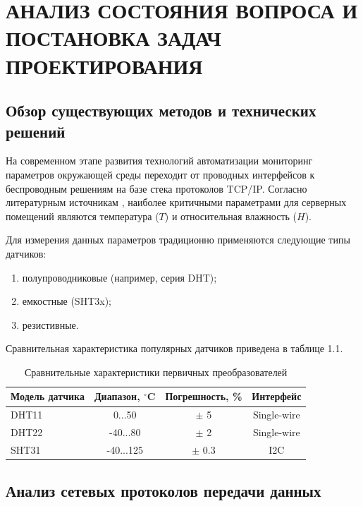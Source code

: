 \chapter{АНАЛИЗ СОСТОЯНИЯ ВОПРОСА И ПОСТАНОВКА ЗАДАЧ ПРОЕКТИРОВАНИЯ}

\section{Обзор существующих методов и технических решений}

На современном этапе развития технологий автоматизации мониторинг параметров окружающей среды переходит от проводных интерфейсов к беспроводным решениям на базе стека протоколов TCP/IP. Согласно литературным источникам \cite{ivanov2023}, наиболее критичными параметрами для серверных помещений являются температура ($T$) и относительная влажность ($H$).

Для измерения данных параметров традиционно применяются следующие типы датчиков:
\begin{enumerate}
    \item полупроводниковые (например, серия DHT);
    \item емкостные (SHT3x);
    \item резистивные.
\end{enumerate}

Сравнительная характеристика популярных датчиков приведена в таблице 1.1.

\begin{table}[h!]
    \centering
    \caption{Сравнительные характеристики первичных преобразователей}
    \begin{tabular}{|l|c|c|c|}
        \hline
        Модель датчика & Диапазон, $^\circ$C & Погрешность, \% & Интерфейс \\ \hline
        DHT11          & 0...50              & $\pm$ 5        & Single-wire \\ \hline
        DHT22          & -40...80            & $\pm$ 2        & Single-wire \\ \hline
        SHT31          & -40...125           & $\pm$ 0.3      & I2C \\ \hline
    \end{tabular}
\end{table}

\section{Анализ сетевых протоколов передачи данных}

